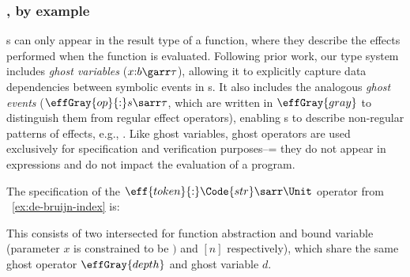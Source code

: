 \subsubsection{\tyName{}, by example}

\tyName{}s can only appear in the result type of a function, where
they describe the effects performed when the function is evaluated.
Following prior work, our type system includes \emph{ghost variables}
($x{:}b \garr \tau$), allowing it to explicitly capture data
dependencies between symbolic events in \tyName{}s. It also includes
the analogous \emph{ghost events} ($\effGray{op}{:}s \sarr \tau$,
which are written in $\effGray{gray}$ to distinguish them from regular
effect operators), enabling \tyName{}s to describe non-regular
patterns of effects, e.g., .  Like ghost
variables, ghost operators are used exclusively for specification and
verification purposes--= they do not appear in expressions and do not
impact the evaluation of a program.

\begin{example}\label{ex:stlc-types}
  The \tyName{} specification of the %
  $\eff{token}{:}\Code{str} \sarr \Unit$ %
  operator from ~\autoref{ex:de-bruijn-index} is:%
  \vspace{-.4cm} \par{}\noindent
  This \tyName{} consists of two intersected \tyName{} for function
  abstraction and bound variable (parameter $x$ is constrained to be
  $\boxed{)}$ and $\boxed{[n]}$ respectively), which share the same
  ghost operator $\effGray{depth}$ and ghost variable $d$.
\end{example}


